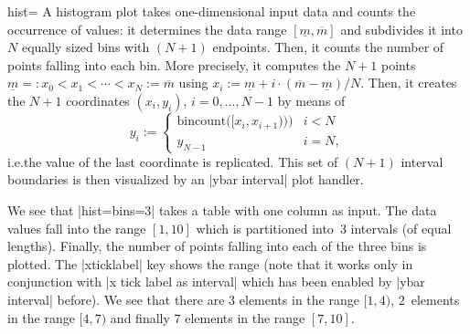 \begin{plottype}[/pgfplots]{hist=\textcolor{black}{\normalfont{}}%
}
    A histogram plot takes one-dimensional input data and counts the occurrence
    of values: it determines the data range $[\underline m,\overline m]$ and
    subdivides it into $N$ equally sized bins with $(N+1)$ endpoints. Then, it
    counts the number of points falling into each bin. More precisely, it
    computes the $N+1$ points $\underline m =: x_0 < x_1 < \dotsb < x_N :=
    \overline m$ using $x_i := \underline m + i \cdot (\overline m - \underline
    m)/N$. Then, it creates the $N+1$ coordinates $(x_i, y_i)$,
    $i=0,\dotsc,N-1$ by means of
        \[
            y_i :=
                \begin{cases}
                    \text{bincount}\bigl([x_i,x_{i+1})\bigr)\Bigr)  & i < N \\
                    y_{N-1}                                         & i = N,
                \end{cases}
        \]
    i.e.\@ the value of the last coordinate is replicated. This set of $(N+1)$
    interval boundaries is then visualized by an |ybar interval| plot handler.
\begin{codeexample}[]
\end{codeexample}
    We see that |hist={bins=3}| takes a table with one column as input. The
    data values fall into the range $[1,10]$ which is partitioned into~$3$
    intervals (of equal lengths). Finally, the number of points falling into
    each of the three bins is plotted. The |xticklabel| key shows the range
    (note that it works only in conjunction with |x tick label as interval|
    which has been enabled by |ybar interval| before). We see that there are
    $3$ elements in the range $[1,4)$, $2$~elements in the range $[4,7)$ and
    finally $7$ elements in the range $[7,10]$.


\end{plottype}
